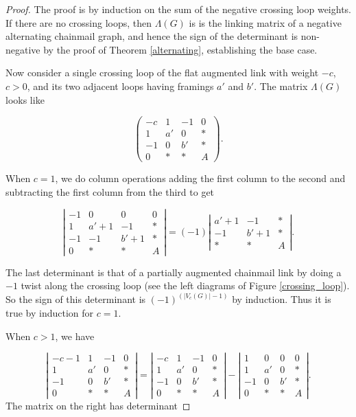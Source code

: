 \documentclass[10pt,a4paper]{amsart}
\begin{document}
\begin{proof}
The proof is by induction on the sum of the negative crossing loop weights. If there are no crossing loops, then $\Lambda(G)$ is is the linking matrix of a negative alternating chainmail graph, and hence the sign of the determinant is non-negative by the proof of Theorem \ref{alternating}, establishing the base case. 

Now consider a single crossing loop of the flat augmented link with weight $- c$, $c > 0$, and its two adjacent loops having framings $a'$ and  $b'$. The matrix $\Lambda(G)$ looks like 

$$\left(\begin{array}{cccc}-c & 1 & -1 & 0 \\1 & a' & 0 & \ast \\-1 & 0 & b' & \ast \\0 & \ast & \ast & A\end{array}\right).$$

When $c=1$, we do column operations adding the first column to the second and subtracting the first column from the third to get 

 $$\left|\begin{array}{cccc}-1 & 0 & 0 & 0 \\1 & a'+1 & -1 & \ast \\-1 & -1 & b'+1 & \ast \\0 & \ast & \ast & A\end{array}\right| = (-1)\left|\begin{array}{ccc}a'+1 & -1 & \ast \\ -1 & b'+1 & \ast \\ \ast & \ast & A\end{array}\right|  .$$

The last determinant is that of a partially augmented chainmail link by doing a $-1$ twist along the crossing loop (see the left diagrams of Figure \ref{crossing_loop}). So the sign of this determinant is $(-1)^{(|V_c(G)|-1)}$ by induction. Thus it is true by induction for $c=1$. 

When $c>1$, we have 

$$\left|\begin{array}{cccc}-c-1 & 1 & -1 & 0 \\1 & a' & 0 & \ast \\-1 & 0 & b' & \ast \\0 & \ast & \ast & A\end{array}\right| =\left|\begin{array}{cccc}-c & 1 & -1 & 0 \\1 & a' & 0 & \ast \\-1 & 0 & b' & \ast \\0 & \ast & \ast & A\end{array}\right| - \left|\begin{array}{cccc}1&0 & 0 & 0 \\1 & a' & 0 & \ast \\-1 & 0 & b' & \ast \\0 & \ast & \ast & A\end{array}\right| .$$
The matrix on the right has determinant 


\end{proof}
\end{document}
